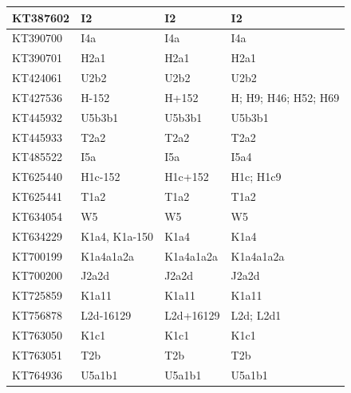 \begin{footnotesize}
\begin{longtable}{|l|l|l|l|}
KT387602          & I2               & I2                   & I2                          \\ \hline
KT390700          & I4a              & I4a                  & I4a                         \\ \hline
KT390701          & H2a1             & H2a1                 & H2a1                        \\ \hline
KT424061          & U2b2             & U2b2                 & U2b2                        \\ \hline
KT427536          & H-152            & H+152                & H; H9; H46; H52; H69        \\ \hline
KT445932          & U5b3b1           & U5b3b1               & U5b3b1                      \\ \hline
KT445933          & T2a2             & T2a2                 & T2a2                        \\ \hline
KT485522          & I5a              & I5a                  & I5a4                        \\ \hline
KT625440          & H1c-152          & H1c+152              & H1c; H1c9                   \\ \hline
KT625441          & T1a2             & T1a2                 & T1a2                        \\ \hline
KT634054          & W5               & W5                   & W5                          \\ \hline
KT634229          & K1a4, K1a-150    & K1a4                 & K1a4                        \\ \hline
KT700199          & K1a4a1a2a        & K1a4a1a2a            & K1a4a1a2a                   \\ \hline
KT700200          & J2a2d            & J2a2d                & J2a2d                       \\ \hline
KT725859          & K1a11            & K1a11                & K1a11                       \\ \hline
KT756878          & L2d-16129        & L2d+16129            & L2d; L2d1                   \\ \hline
KT763050          & K1c1             & K1c1                 & K1c1                        \\ \hline
KT763051          & T2b              & T2b                  & T2b                         \\ \hline
KT764936          & U5a1b1           & U5a1b1               & U5a1b1                      \\ \hline

\end{longtable}
\end{footnotesize}
